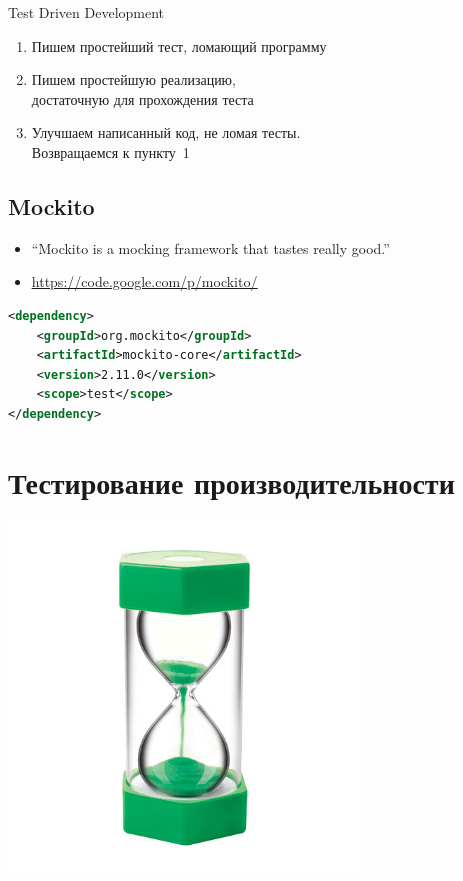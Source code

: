 \documentclass[unicode]{beamer}
\begin{document}
\begin{frame}{Test Driven Development}
\begin{enumerate}
\item Пишем простейший тест, ломающий программу
    \bigskip

\item Пишем простейшую реализацию,\\ достаточную для прохождения теста
    \bigskip

\item Улучшаем написанный код, не ломая тесты.\\
    Возвращаемся к пункту~1
\end{enumerate}
\end{frame}


\subsection{Mockito}

\begin{frame}[fragile]
\begin{itemize}
\item ``Mockito is a mocking framework that tastes really good.''
    \bigskip

\item \underline{\url{https://code.google.com/p/mockito/}}
\end{itemize}
\bigskip
\begin{lstlisting}[language=xml,keywords={}]
<dependency>
    <groupId>org.mockito</groupId>
    <artifactId>mockito-core</artifactId>
    <version>2.11.0</version>
    <scope>test</scope>
</dependency>
\end{lstlisting}
\end{frame}



\section{Тестирование производительности}

\begin{frame}
\centering
\includegraphics[width=0.7\textwidth]{pics/sandtimer.jpg}
\end{frame}
\end{document}
